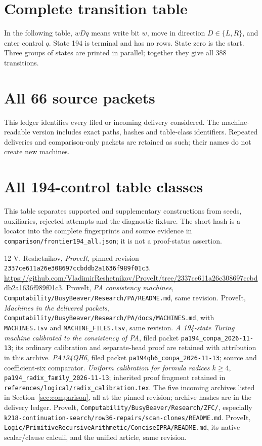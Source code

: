 \documentclass[11pt,letterpaper]{article}
\newcommand{\file}[1]{\texttt{\nolinkurl{#1}}}
\newcommand{\snapshot}{\texttt{2337ce611a26e308697ccbddb2a1636f989f01c3}}
\begin{document}
\appendix
\section{Complete transition table}\label{app:table}
In the following table, $wDq$ means write bit $w$, move in direction
$D\in\{L,R\}$, and enter control $q$. State 194 is terminal and has no
rows. State zero is the start. Three groups of states are printed in
parallel; together they give all 388 transitions.


\section{All 66 source packets}\label{app:ledger}
This ledger identifies every filed or incoming delivery considered.
The machine-readable version includes exact paths, hashes and table-class
identifiers. Repeated deliveries and comparison-only packets are retained
as such; their names do not create new machines.


\section{All 194-control table classes}\label{app:frontier}
This table separates supported and supplementary constructions from seeds,
auxiliaries, rejected attempts and the diagnostic fixture. The short hash
is a locator into the complete fingerprints and source evidence in
\file{comparison/frontier194_all.json}; it is not a proof-status assertion.


\begin{thebibliography}{12}
 V. Reshetnikov, \emph{ProveIt}, pinned revision
\snapshot. \url{https://github.com/VladimirReshetnikov/ProveIt/tree/2337ce611a26e308697ccbddb2a1636f989f01c3}.
 ProveIt, \emph{PA consistency machines},
\file{Computability/BusyBeaver/Research/PA/README.md}, same revision.
 ProveIt, \emph{Machines in the delivered packets},
\file{Computability/BusyBeaver/Research/PA/docs/MACHINES.md},
with \file{MACHINES.tsv} and \file{MACHINE_FILES.tsv}, same revision.
 \emph{A 194-state Turing machine calibrated to the consistency
of PA}, filed packet \file{pa194_conpa_2026-11-13}; its ordinary calibration
and separate-head proof are retained with attribution in this archive.
 \emph{PA194QH6}, filed packet
\file{pa194qh6_conpa_2026-11-13}; source and coefficient-six comparator.
 \emph{Uniform calibration for formula radices $k\ge4$},
\file{pa194_radix_family_2026-11-13}; inherited proof fragment retained in
\file{references/logical/radix_calibration.tex}.
 The five incoming archives listed in Section~\ref{sec:comparison},
all at the pinned revision; archive hashes are in the delivery ledger.
 ProveIt, \file{Computability/BusyBeaver/Research/ZFC/}, especially
\file{k218-continuation-search/row36-repairs/scan-clones/README.md}.
 ProveIt,
\file{Logic/PrimitiveRecursiveArithmetic/ConciseIPRA/README.md},
its native scalar/clause calculi, and the unified article, same revision.
\end{thebibliography}
\end{document}
